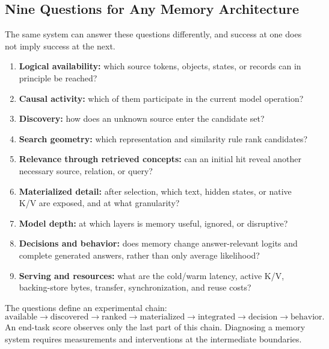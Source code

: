 \documentclass[10pt,a4paper]{article}
\begin{document}
\subsection{Nine Questions for Any Memory Architecture}
The same system can answer these questions differently, and success at one does not imply
success at the next.
\begin{enumerate}
\item \textbf{Logical availability:} which source tokens, objects, states, or records can in
principle be reached?
\item \textbf{Causal activity:} which of them participate in the current model operation?
\item \textbf{Discovery:} how does an unknown source enter the candidate set?
\item \textbf{Search geometry:} which representation and similarity rule rank candidates?
\item \textbf{Relevance through retrieved concepts:} can an initial hit reveal another
necessary source, relation, or query?
\item \textbf{Materialized detail:} after selection, which text, hidden states, or native K/V
are exposed, and at what granularity?
\item \textbf{Model depth:} at which layers is memory useful, ignored, or disruptive?
\item \textbf{Decisions and behavior:} does memory change answer-relevant logits and complete
generated answers, rather than only average likelihood?
\item \textbf{Serving and resources:} what are the cold/warm latency, active K/V, backing-store
bytes, transfer, synchronization, and reuse costs?
\end{enumerate}

The questions define an experimental chain:
\begin{equation}
\text{available}\rightarrow\text{discovered}\rightarrow\text{ranked}
\rightarrow\text{materialized}\rightarrow\text{integrated}
\rightarrow\text{decision}\rightarrow\text{behavior}.
\end{equation}
An end-task score observes only the last part of this chain. Diagnosing a memory system
requires measurements and interventions at the intermediate boundaries.
\end{document}
